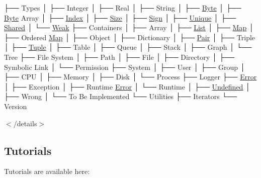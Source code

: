 \begin{DoxyCode}
├── Types
│   ├── Integer
│   ├── Real
│   ├── String
│   ├── \hyperlink{namespaceostk_1_1core_1_1types_a0733eebee5d093ea04df859028e2649f}{Byte}
│   ├── \hyperlink{namespaceostk_1_1core_1_1types_a0733eebee5d093ea04df859028e2649f}{Byte} Array
│   ├── \hyperlink{namespaceostk_1_1core_1_1types_a6e63c1b15b2e5bc87a43771c09fa913a}{Index}
│   ├── \hyperlink{namespaceostk_1_1core_1_1types_acf68f214a245e35a7c1994c84dc56746}{Size}
│   ├── \hyperlink{namespaceostk_1_1core_1_1types_ae10e15cf66b50aaec17f4f78c984d7bf}{Sign}
│   ├── \hyperlink{namespaceostk_1_1core_1_1types_a0ff1c5e84c7c42c929044b1be97ba680}{Unique}
│   ├── \hyperlink{namespaceostk_1_1core_1_1types_a3e7aff47b81452ed1f18f6d8f6c90140}{Shared}
│   └── \hyperlink{namespaceostk_1_1core_1_1types_a0dd80951dd3139e43b5c0b3e5928d08a}{Weak}
├── Containers
│   ├── Array
│   ├── \hyperlink{namespaceostk_1_1core_1_1ctnr_a5802e21d045076175dcb310a7045c858}{List}
│   ├── \hyperlink{namespaceostk_1_1core_1_1ctnr_a2184a633cc52230b0617fab960393bc5}{Map}
│   ├── Ordered \hyperlink{namespaceostk_1_1core_1_1ctnr_a2184a633cc52230b0617fab960393bc5}{Map}
│   ├── Object
│   ├── Dictionary
│   ├── \hyperlink{namespaceostk_1_1core_1_1ctnr_a08e64f04352e3c432bff0cfd3b23923b}{Pair}
│   ├── Triple
│   ├── \hyperlink{namespaceostk_1_1core_1_1ctnr_a7f01ca040222e5b0c02a90aa68cc8e88}{Tuple}
│   ├── Table
│   ├── Queue
│   ├── Stack
│   ├── Graph
│   └── Tree
├── File System
│   ├── Path
│   ├── File
│   ├── Directory
│   ├── Symbolic Link
│   └── Permission
├── System
│   ├── User
│   ├── Group
│   ├── CPU
│   ├── Memory
│   ├── Disk
│   └── Process
├── Logger
├── \hyperlink{namespaceostk_1_1core_1_1logger_a52d02954e094391f067befffe7f3cae9a902b0d55fddef6f8d651fe1035b7d4bd}{Error}
│   ├── Exception
│   ├── Runtime \hyperlink{namespaceostk_1_1core_1_1logger_a52d02954e094391f067befffe7f3cae9a902b0d55fddef6f8d651fe1035b7d4bd}{Error}
│   └── Runtime
│       ├── \hyperlink{namespaceostk_1_1core_1_1types_ae10e15cf66b50aaec17f4f78c984d7bfaec0fc0100c4fc1ce4eea230c3dc10360}{Undefined}
│       ├── Wrong
│       └── To Be Implemented
└── Utilities
    ├── Iterators
    └── Version
\end{DoxyCode}
 

$<$/details$>$

\subsection*{Tutorials}

Tutorials are available here\+:


